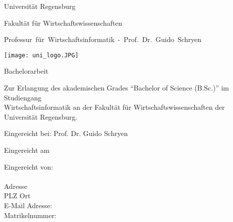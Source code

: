 %
%
%

\thispagestyle{empty}
\begin{titlepage}

\begin{adjustwidth}{-2cm}{}


\renewcommand{\thepage}{}

\begin{center}

\large{Universität Regensburg\\}

\large{Fakultät für Wirtschaftswissenschaften\\}

\large{\mbox{Professur für Wirtschaftsinformatik - Prof. Dr. Guido Schryen}}

\vspace*{5mm}

\Large{\textbf{\titelthema}}

\vspace*{5mm}
\texttt{[image: uni\_logo.JPG]}
\vspace*{4mm}

\Large{Bachelorarbeit}

\vspace*{5mm}


\end{center}
\begin{center}
Zur Erlangung des akademischen Grades "`Bachelor of Science (B.Sc.)"' im Studiengang\\
Wirtschaftsinformatik an der Fakultät für Wirtschaftswissenschaften der\\
Universität Regensburg.\\


\vspace*{5mm}

\Large{Eingereicht bei: Prof. Dr. Guido Schryen\\}


\end{center}

\vfill

\begin{center}
\large{Eingereicht am \abgabedatum\\}
\end{center}
\vspace*{0.6cm}
\begin{flushleft}
Eingereicht von:\\
\vspace*{7pt}
\authorname\\
Adresse\\
PLZ Ort\\
E-Mail Adresse: \authormail\\
Matrikelnummer: \matrikelnr\\





\end{flushleft}
\end{adjustwidth}
\end{titlepage}

